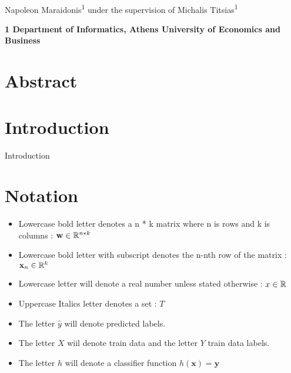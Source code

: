 \documentclass[10pt,letterpaper]{article}
\begin{document}
\vspace*{0.35in}
	\begin{flushleft}
		{\Large
			\textbf{}
		}
		\newline
		\\
		Napoleon Maraidonis\textsuperscript{1} under the supervision of
		Michalis Titsias\textsuperscript{1}		
						
		\bigskip
		\bf{1} Department of Informatics, Athens University of Economics and Business
		\\		
	\end{flushleft}
	
	\section*{Abstract}
	
	
	\section*{Introduction}
	
	Introduction \cite{extreme_MLC_omar} \cite{extreme_MLC_rep} \cite{MLC_finland}
	

	\section*{Notation}

	\begin{itemize}
		\item Lowercase bold letter denotes a n * k matrix where n is rows and k is columns :  $\textbf{w} \in  {\Bbb R}^{n * k}$
		
		\item Lowercase bold letter with subscript denotes the n-nth row of the matrix : $\textbf{x}_{n} \in  {\Bbb R}^{k}$
				
		\item Lowercase letter will denote a real number unless stated otherwise	:	$x \in {\Bbb R}$
		
		\item Uppercase Italics letter denotes a set : $\textit{T} $
		
		\item The letter $\hat{y}$ will denote predicted labels.
		
		\item The letter $X$ wiil denote train data and the letter $Y$ train data labels.
		
		\item The letter $h$ will denote a classifier function $h(\textbf{x}) = \textbf{y}$  
		

	\end{itemize}
	\newpage
	
\end{document}
